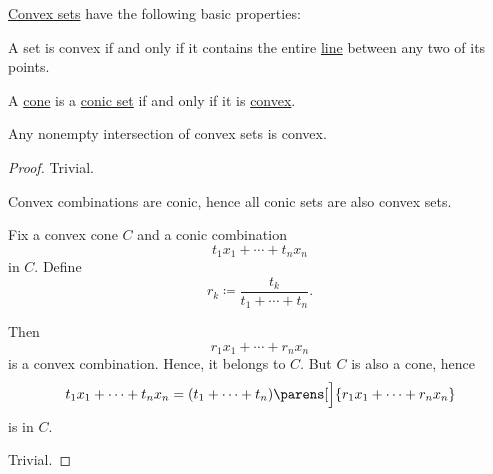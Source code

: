 \begin{proposition}\label{thm:def:convex_hull}
  \hyperref[def:convex_hull]{Convex sets} have the following basic properties:

  \begin{thmenum}
     A set is convex if and only if it contains the entire \hyperref[def:line_segment]{line} between any two of its points.

     A \hyperref[def:geometric_cone]{cone} is a \hyperref[def:convex_hull]{conic set} if and only if it is \hyperref[def:convex_hull]{convex}.

     Any nonempty intersection of convex sets is convex.
  \end{thmenum}
\end{proposition}
\begin{proof}
   Trivial.

  \SufficiencySubProof* Convex combinations are conic, hence all conic sets are also convex sets.

  \NecessitySubProof* Fix a convex cone \( C \) and a conic combination
  \begin{equation*}
    t_1 x_1 + \cdots + t_n x_n
  \end{equation*}
  in \( C \). Define
  \begin{equation*}
    r_k \coloneqq \frac {t_k} {t_1 + \cdots + t_n}.
  \end{equation*}

  Then
  \begin{equation*}
    r_1 x_1 + \cdots + r_n x_n
  \end{equation*}
  is a convex combination. Hence, it belongs to \( C \). But \( C \) is also a cone, hence
  \begin{equation*}
    t_1 x_1 + \cdots + t_n x_n = (t_1 + \cdots + t_n) \parens[\Big]{ r_1 x_1 + \cdots + r_n x_n }
  \end{equation*}
  is in \( C \).

   Trivial.
\end{proof}

